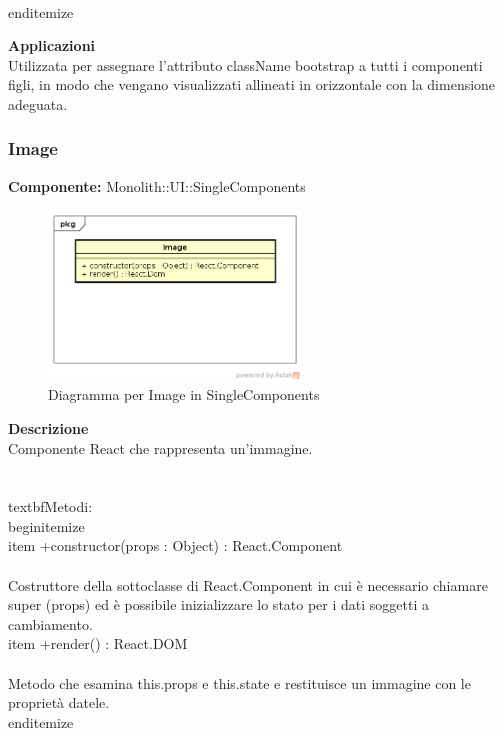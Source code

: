 \\end{itemize} 


\textbf{Applicazioni}\\
Utilizzata per assegnare l'attributo className bootstrap a tutti i componenti figli, in modo che vengano visualizzati allineati in orizzontale con la dimensione adeguata. 


\clearpage

\subsubsection{Image}
\textbf{Componente:}  Monolith::UI::SingleComponents\\
   \FloatBarrier
   \begin{figure}[ht]
   \centering
   \includegraphics[width=0.6\textwidth]{img/single-Image}
   \caption{{Diagramma per Image in SingleComponents}}
\end{figure}
\FloatBarrier
\textbf{Descrizione}\\
Componente React che rappresenta un'immagine. \\\\
\\textbf{Metodi:} 
\\begin{itemize}
\\item +constructor(props : Object) : React.Component 
\\\\
Costruttore della sottoclasse di React.Component in cui è necessario chiamare super (props) ed è possibile inizializzare lo stato per i dati soggetti a cambiamento.
\\item +render() : React.DOM 
\\\\
Metodo che esamina this.props e this.state e restituisce un immagine con le proprietà datele.
\\end{itemize} 


